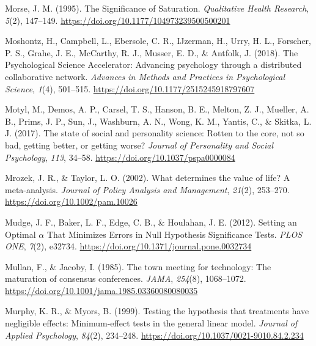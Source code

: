 \documentclass[
  letterpaper,
  DIV=11,
  numbers=noendperiod]{scrreprt}
\newlength{\cslhangindent}
\newlength{\cslentryspacingunit} %
\newenvironment{CSLReferences}[2] %
 {%
  \setlength{\parindent}{0pt}
  \ifodd #1
  \let\oldpar\par
  \def\par{\hangindent=\cslhangindent\oldpar}
  \fi
  \setlength{\parskip}{#2\cslentryspacingunit}
 }%
 {}
\begin{document}
\begin{CSLReferences}{1}{0}
\leavevmode{}%
Morse, J. M. (1995). The {Significance} of {Saturation}.
\emph{Qualitative Health Research}, \emph{5}(2), 147--149.
\url{https://doi.org/10.1177/104973239500500201}

\leavevmode{}%
Moshontz, H., Campbell, L., Ebersole, C. R., IJzerman, H., Urry, H. L.,
Forscher, P. S., Grahe, J. E., McCarthy, R. J., Musser, E. D., \&
Antfolk, J. (2018). The {Psychological Science Accelerator}: {Advancing}
psychology through a distributed collaborative network. \emph{Advances
in Methods and Practices in Psychological Science}, \emph{1}(4),
501--515. \url{https://doi.org/10.1177/2515245918797607}

\leavevmode{}%
Motyl, M., Demos, A. P., Carsel, T. S., Hanson, B. E., Melton, Z. J.,
Mueller, A. B., Prims, J. P., Sun, J., Washburn, A. N., Wong, K. M.,
Yantis, C., \& Skitka, L. J. (2017). The state of social and personality
science: {Rotten} to the core, not so bad, getting better, or getting
worse? \emph{Journal of Personality and Social Psychology}, \emph{113},
34--58. \url{https://doi.org/10.1037/pspa0000084}

\leavevmode{}%
Mrozek, J. R., \& Taylor, L. O. (2002). What determines the value of
life? A meta-analysis. \emph{Journal of Policy Analysis and Management},
\emph{21}(2), 253--270. \url{https://doi.org/10.1002/pam.10026}

\leavevmode{}%
Mudge, J. F., Baker, L. F., Edge, C. B., \& Houlahan, J. E. (2012).
Setting an {Optimal} {\(\alpha\)} {That Minimizes Errors} in {Null
Hypothesis Significance Tests}. \emph{PLOS ONE}, \emph{7}(2), e32734.
\url{https://doi.org/10.1371/journal.pone.0032734}

\leavevmode{}%
Mullan, F., \& Jacoby, I. (1985). The town meeting for technology: {The}
maturation of consensus conferences. \emph{JAMA}, \emph{254}(8),
1068--1072. \url{https://doi.org/10.1001/jama.1985.03360080080035}

\leavevmode{}%
Murphy, K. R., \& Myors, B. (1999). Testing the hypothesis that
treatments have negligible effects: {Minimum-effect} tests in the
general linear model. \emph{Journal of Applied Psychology},
\emph{84}(2), 234--248. \url{https://doi.org/10.1037/0021-9010.84.2.234}


\end{CSLReferences}
\end{document}
